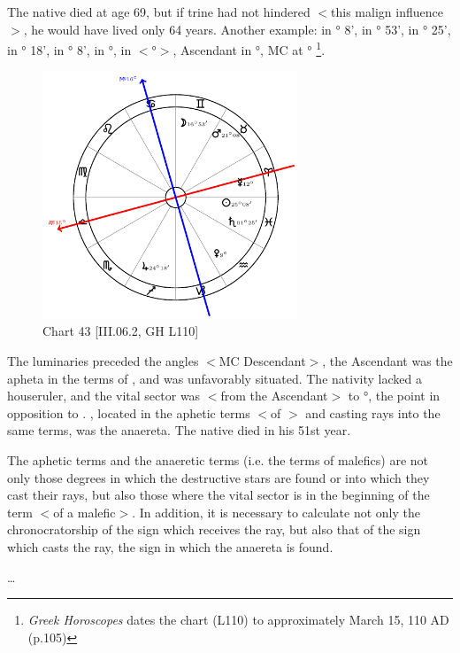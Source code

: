 The native died at age 69, but if \Jupiter\xspace trine had not hindered $<$this malign influence$>$, he would have lived only 64 years.
\newpage
Another example: \Sun\xspace in \Pisces\xspace 25° 8', \Moon\xspace in \Gemini\xspace 16° 53', \Saturn\xspace in \Pisces\xspace 1° 25', \Jupiter\xspace in
\Sagittarius\xspace 24° 18', \Mars\xspace in \Taurus\xspace 21° 8', \Venus\xspace in \Aquarius\xspace 9°, \Mercury\xspace in $<$°$>$, Ascendant in \Libra\xspace 15°, MC at \Cancer\xspace 16°
\footnote{\textit{Greek Horoscopes} dates the chart (L110) to approximately March 15, 110 AD (p.105)}.  

\clearpage
\begin{figure}
\centering
\vspace{-20pt}
\includegraphics[width=0.68\textwidth]{charts/3_06_2}
\caption{Chart 43 [III.06.2, GH L110]}
\label{fig:chart43}
\end{figure} 

The luminaries preceded the angles $<$MC Descendant$>$, the Ascendant was the apheta in the terms of \Jupiter, and \Jupiter\xspace was unfavorably situated. The nativity lacked a houseruler, and the vital sector was $<$from the Ascendant$>$ to \Scorpio\xspace 21°, the point in opposition to \Mars. \Mars, located in the aphetic terms $<$of \Jupiter$>$ and casting rays into the same terms, was the anaereta. The
native died in his 51st year.

The aphetic terms and the anaeretic terms (i.e. the terms of malefics) are not only those degrees in which the destructive stars are found or into which they cast their rays, but also those where the vital sector
is in the beginning of the term $<$of a malefic$>$. In addition, it is necessary to calculate not only the chronocratorship of the sign which receives the ray, but also that of the sign which casts the ray, the sign in which the anaereta is found.

\ldots
\newpage